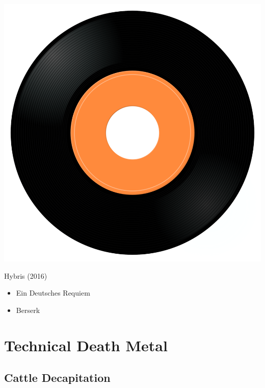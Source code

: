 \begin{minipage}[t]{0.25\textwidth}\vspace{0pt}
\captionsetup{type=figure}
\includegraphics[width=\textwidth]{Images/cover.png}
\caption*{Hybris (2016)}
\end{minipage}
\begin{minipage}[t]{0.25\textwidth}\vspace{0pt}
\begin{itemize}[nosep,leftmargin=1em,labelwidth=*,align=left]
	\setlength{\itemsep}{0pt}
	\item Ein Deutsches Requiem
	\item Berserk
\end{itemize}
\end{minipage}

\cleardoublepage
\section{Technical Death Metal}

\subsection{Cattle Decapitation}

